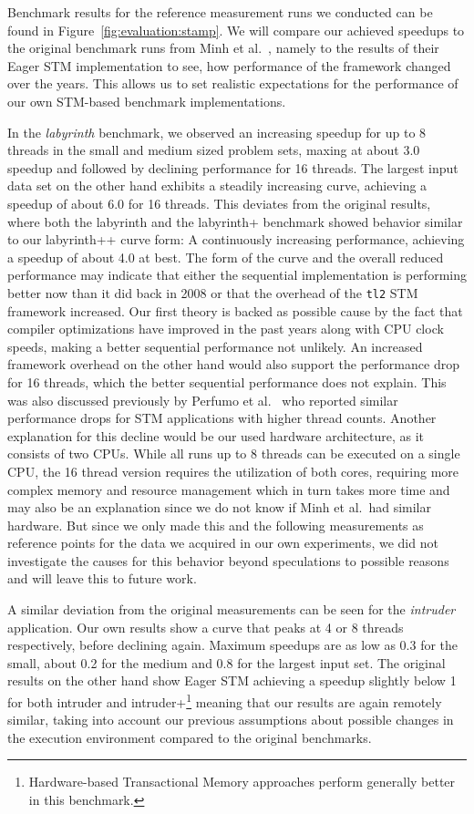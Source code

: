 Benchmark results for the reference measurement runs we conducted can be found in Figure~\ref{fig:evaluation:stamp}.
We will compare our achieved speedups to the original benchmark runs from Minh et al.~\cite{minh2008stamp}, namely to the results of their Eager STM implementation to see, how performance of the framework changed over the years.
This allows us to set realistic expectations for the performance of our own STM-based benchmark implementations.

In the \emph{labyrinth} benchmark, we observed an increasing speedup for up to 8 threads in the small and medium sized problem sets, maxing at about 3.0 speedup and followed by declining performance for 16 threads.
The largest input data set on the other hand exhibits a steadily increasing curve, achieving a speedup of about 6.0 for 16 threads.
This deviates from the original results, where both the labyrinth and the labyrinth+ benchmark showed behavior similar to our labyrinth++ curve form: A continuously increasing performance, achieving a speedup of about 4.0 at best.
The form of the curve and the overall reduced performance may indicate that either the sequential implementation is performing better now than it did back in 2008 or that the overhead of the \texttt{tl2} STM framework increased.
Our first theory is backed as possible cause by the fact that compiler optimizations have improved in the past years along with CPU clock speeds, making a better sequential performance not unlikely.
An increased framework overhead on the other hand would also support the performance drop for 16 threads, which the better sequential performance does not explain.
This was also discussed previously by Perfumo et al.~\cite{perfumo2008limits} who reported similar performance drops for STM applications with higher thread counts.
Another explanation for this decline would be our used hardware architecture, as it consists of two CPUs.
While all runs up to 8 threads can be executed on a single CPU, the 16 thread version requires the utilization of both cores, requiring more complex memory and resource management which in turn takes more time and may also be an explanation since we do not know if Minh et al.\ had similar hardware.
But since we only made this and the following measurements as reference points for the data we acquired in our own experiments, we did not investigate the causes for this behavior beyond speculations to possible reasons and will leave this to future work.

A similar deviation from the original measurements can be seen for the \emph{intruder} application.
Our own results show a curve that peaks at 4 or 8 threads respectively, before declining again.
Maximum speedups are as low as 0.3 for the small, about 0.2 for the medium and 0.8 for the largest input set.
The original results on the other hand show Eager STM achieving a speedup slightly below 1 for both intruder and intruder+\footnote{Hardware-based Transactional Memory approaches perform generally better in this benchmark.} meaning that our results are again remotely similar, taking into account our previous assumptions about possible changes in the execution environment compared to the original benchmarks.

